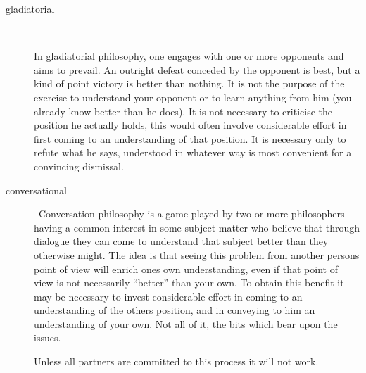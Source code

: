 \documentclass[10pt,titlepage]{book}
\begin{document}
\begin{description}

\item[gladiatorial] \ 

In gladiatorial philosophy, one engages with one or more opponents and aims to prevail.
An outright defeat conceded by the opponent is best, but a kind of point victory is better than nothing.
It is not the purpose of the exercise to understand your opponent or to learn anything from him (you already know better than he does).
It is not necessary to criticise the position he actually holds, this would often involve considerable effort in first coming to an understanding of that position.
It is necessary only to refute what he says, understood in whatever way is most convenient for a convincing dismissal.

\item[conversational] \ 
Conversation philosophy is a game played by two or more philosophers having a common interest in some subject matter who believe that through dialogue they can come to understand that subject better than they otherwise might.
The idea is that seeing this problem from another persons point of view will enrich ones own understanding, even if that point of view is not necessarily ``better'' than your own.
To obtain this benefit it may be necessary to invest considerable effort in coming to an understanding of the others position, and in conveying to him an understanding of your own.
Not all of it, the bits which bear upon the issues.

Unless all partners are committed to this process it will not work.
\end{description}
\end{document}
